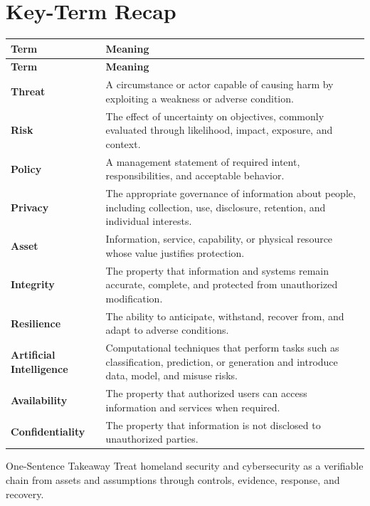 \documentclass[11pt,letterpaper]{article}
\begin{document}
\section*{Key-Term Recap}
\begin{longtable}{>{\raggedright\arraybackslash}p{}>{\raggedright\arraybackslash}p{}}
\toprule\rowcolor{Navy}\color{white}\textbf{Term} & \color{white}\textbf{Meaning}\\\midrule
\endfirsthead
\toprule\rowcolor{Navy}\color{white}\textbf{Term} & \color{white}\textbf{Meaning}\\\midrule
\endhead
\textbf{Threat} & A circumstance or actor capable of causing harm by exploiting a weakness or adverse condition. \\\midrule
\textbf{Risk} & The effect of uncertainty on objectives, commonly evaluated through likelihood, impact, exposure, and context. \\\midrule
\textbf{Policy} & A management statement of required intent, responsibilities, and acceptable behavior. \\\midrule
\textbf{Privacy} & The appropriate governance of information about people, including collection, use, disclosure, retention, and individual interests. \\\midrule
\textbf{Asset} & Information, service, capability, or physical resource whose value justifies protection. \\\midrule
\textbf{Integrity} & The property that information and systems remain accurate, complete, and protected from unauthorized modification. \\\midrule
\textbf{Resilience} & The ability to anticipate, withstand, recover from, and adapt to adverse conditions. \\\midrule
\textbf{Artificial Intelligence} & Computational techniques that perform tasks such as classification, prediction, or generation and introduce data, model, and misuse risks. \\\midrule
\textbf{Availability} & The property that authorized users can access information and services when required. \\\midrule
\textbf{Confidentiality} & The property that information is not disclosed to unauthorized parties. \\\midrule
\bottomrule
\end{longtable}
\begin{CornellExamBox}{One-Sentence Takeaway}
Treat homeland security and cybersecurity as a verifiable chain from assets and assumptions through controls, evidence, response, and recovery.
\end{CornellExamBox}
\end{document}
